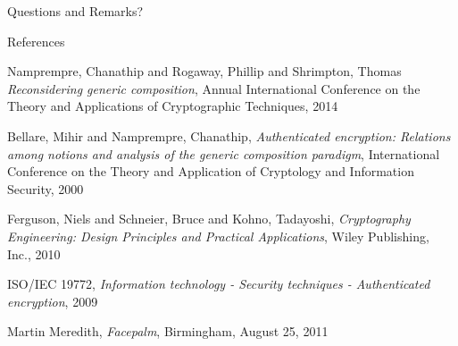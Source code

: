 \documentclass[11pt]{beamer}
\begin{document}
\begin{frame}
\begin{center}
{\huge Questions and Remarks?}
\end{center}
\end{frame}

\begin{frame}{References}
\begin{tiny}
\begin{thebibliography}{9}
	Namprempre, Chanathip and Rogaway, Phillip and Shrimpton, Thomas
	\emph{Reconsidering generic composition},
	Annual International Conference on the Theory and Applications of Cryptographic Techniques,
	2014

	Bellare, Mihir and Namprempre, Chanathip,
	\emph{Authenticated encryption: Relations among notions and analysis of the generic composition paradigm},
	International Conference on the Theory and Application of Cryptology and Information Security,
	2000

	Ferguson, Niels and Schneier, Bruce and Kohno, Tadayoshi,
	\emph{Cryptography Engineering: Design Principles and Practical Applications},
	Wiley Publishing, Inc.,
	2010

	ISO/IEC 19772,
	\emph{Information technology - Security techniques - Authenticated encryption},
	2009

	Martin Meredith,
	\emph{Facepalm},
	Birmingham, August 25, 2011

\end{thebibliography}
\end{tiny}
\end{frame}
\end{document}
